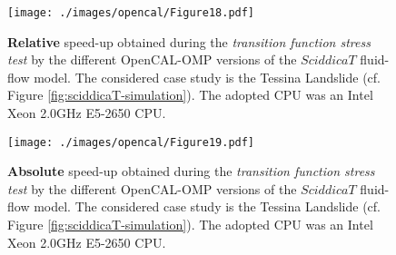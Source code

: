 \begin{figure}
	\begin{center}
		\texttt{[image: ./images/opencal/Figure18.pdf]}
		\caption[\textbf{Relative} speed-up obtained during the \emph{transition function stress	test} by the different OpenCAL-OMP versions of the $SciddicaT$ fluid-flow model.]{\textbf{Relative} speed-up obtained during the \emph{transition function stress
				test} by the different OpenCAL-OMP versions of the $SciddicaT$
			fluid-flow model. The considered case study is the Tessina Landslide
			(cf. Figure \ref{fig:sciddicaT-simulation}). The adopted CPU was an
			Intel Xeon 2.0GHz E5-2650 CPU.}
		\label{gr:sciddicaT-OMP-relative-speed-up-stress}
	\end{center}
\end{figure}

\begin{figure}
	\begin{center}
		\texttt{[image: ./images/opencal/Figure19.pdf]}
		\caption[\textbf{Absolute} speed-up obtained during the \emph{transition function stress test} by the different OpenCAL-OMP versions of the $SciddicaT$
		fluid-flow model.]{\textbf{Absolute} speed-up obtained during the \emph{transition function stress test} by the different OpenCAL-OMP versions of the $SciddicaT$
			fluid-flow model. The considered case study is the Tessina Landslide
			(cf. Figure \ref{fig:sciddicaT-simulation}). The adopted CPU was an
			Intel Xeon 2.0GHz E5-2650 CPU.}
		\label{gr:sciddicaT-OMP-absolute-speed-up-stress}
	\end{center}
\end{figure}


